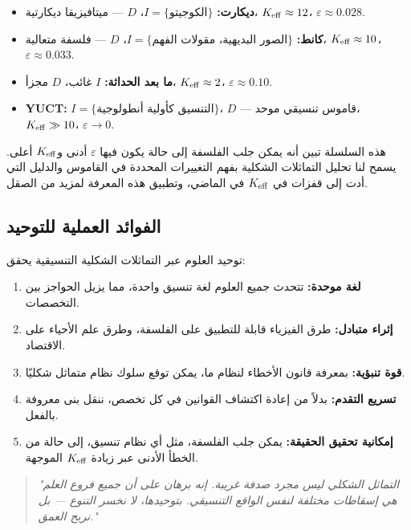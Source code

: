 \documentclass[11pt,a4paper]{article}
\newcommand{\eps}{\varepsilon}
\begin{document}
	\begin{itemize}
		\item \textbf{ديكارت:} \(I = \{\textit{الكوجيتو}\}\)، \(D\) — ميتافيزيقا ديكارتية، \(\Keff \approx 12\)، \(\eps \approx 0.028\).
		\item \textbf{كانط:} \(I = \{\text{الصور البديهية، مقولات الفهم}\}\)، \(D\) — فلسفة متعالية، \(\Keff \approx 10\)، \(\eps \approx 0.033\).
		\item \textbf{ما بعد الحداثة:} \(I\) غائب، \(D\) مجزأ، \(\Keff \approx 2\)، \(\eps \approx 0.10\).
		\item \textbf{YUCT:} \(I = \{\text{التنسيق كأولية أنطولوجية}\}\)، \(D\) — قاموس تنسيقي موحد، \(\Keff \gg 10\)، \(\eps \to 0\).
	\end{itemize}
	
	هذه السلسلة تبين أنه يمكن جلب الفلسفة إلى حالة يكون فيها \(\eps\) أدنى و\(\Keff\) أعلى. يسمح لنا تحليل التماثلات الشكلية بفهم التغييرات المحددة في القاموس والدليل التي أدت إلى قفزات في \(\Keff\) في الماضي، وتطبيق هذه المعرفة لمزيد من الصقل.
	
	\subsection{الفوائد العملية للتوحيد}
	
	توحيد العلوم عبر التماثلات الشكلية التنسيقية يحقق:
	
	\begin{enumerate}
		\item \textbf{لغة موحدة:} تتحدث جميع العلوم لغة تنسيق واحدة، مما يزيل الحواجز بين التخصصات.
		\item \textbf{إثراء متبادل:} طرق الفيزياء قابلة للتطبيق على الفلسفة، وطرق علم الأحياء على الاقتصاد.
		\item \textbf{قوة تنبؤية:} بمعرفة قانون الأخطاء لنظام ما، يمكن توقع سلوك نظام متماثل شكليًا.
		\item \textbf{تسريع التقدم:} بدلاً من إعادة اكتشاف القوانين في كل تخصص، ننقل بنى معروفة بالفعل.
		\item \textbf{إمكانية تحقيق الحقيقة:} يمكن جلب الفلسفة، مثل أي نظام تنسيق، إلى حالة من الخطأ الأدنى عبر زيادة \(\Keff\) الموجهة.
	\end{enumerate}
	
	\begin{quote}
		\itshape
		"التماثل الشكلي ليس مجرد صدفة غريبة. إنه برهان على أن جميع فروع العلم هي إسقاطات مختلفة لنفس الواقع التنسيقي. بتوحيدها، لا نخسر التنوع — بل نربح العمق."
	\end{quote}
	
\end{document}
